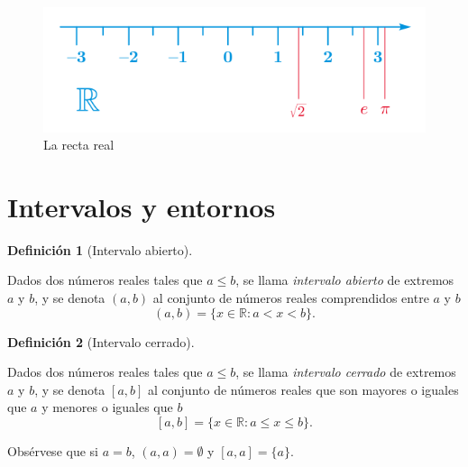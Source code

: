 \documentclass[
  a4paper,
]{scrreport}
\theoremstyle{definition}
\newtheorem{definition}{Definición}[chapter]
\theoremstyle{plain}
\theoremstyle{plain}
\theoremstyle{definition}
\theoremstyle{definition}
\theoremstyle{plain}
\theoremstyle{remark}
\begin{document}
\begin{figure}

{\centering \includegraphics{img/topologia-reales/recta-real.png}

}

\caption{La recta real}

\end{figure}

\hypertarget{intervalos-y-entornos}{%
\section{Intervalos y entornos}\label{intervalos-y-entornos}}

\begin{definition}[Intervalo
abierto]\protect\hypertarget{def-intervalo-abierto}{}\label{def-intervalo-abierto}

Dados dos números reales tales que \(a\leq b\), se llama \emph{intervalo
abierto} de extremos \(a\) y \(b\), y se denota \((a,b)\) al conjunto de
números reales comprendidos entre \(a\) y \(b\) \[
(a,b) = \{x\in \mathbb{R}: a<x<b\}.
\]

\end{definition}

\begin{definition}[Intervalo
cerrado]\protect\hypertarget{def-intervalo-cerrado}{}\label{def-intervalo-cerrado}

Dados dos números reales tales que \(a\leq b\), se llama \emph{intervalo
cerrado} de extremos \(a\) y \(b\), y se denota \([a,b]\) al conjunto de
números reales que son mayores o iguales que \(a\) y menores o iguales
que \(b\) \[
[a,b] = \{x\in \mathbb{R}: a\leq x\leq b\}.
\]

\end{definition}

\begin{tcolorbox}[enhanced jigsaw, breakable, title=\textcolor{quarto-callout-warning-color}{\faExclamationTriangle}\hspace{0.5em}{Advertencia}, toprule=.15mm, coltitle=black, arc=.35mm, rightrule=.15mm, colframe=quarto-callout-warning-color-frame, colbacktitle=quarto-callout-warning-color!10!white, toptitle=1mm, titlerule=0mm, leftrule=.75mm, opacityback=0, colback=white, bottomrule=.15mm, bottomtitle=1mm, left=2mm, opacitybacktitle=0.6]

Obsérvese que si \(a=b\), \((a,a)=\emptyset\) y \([a,a]=\{a\}\).

\end{tcolorbox}
\end{document}
